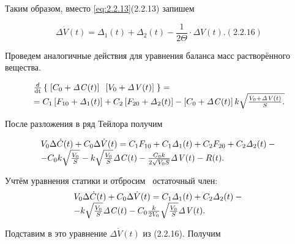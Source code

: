 	Таким образом, вместо \eqref{eq:2.2.13}(2.2.13) запишем

\begin{equation}\label{key}
		 \Delta \dot V(t)=\mathit{\Delta}_{1}(t)+\mathit{\Delta  }_{2}(t)-\frac {1}{2\Theta }\cdot \mathit{\Delta V}(t). (2.2.16)
\end{equation}



		Проведем аналогичные действия для уравнения баланса масс раст­во­рён­ного вещества. 

\begin{equation*}
\begin{matrix}\frac
d{\text{dt}}\left\{\;\left[C_0+\mathit{\Delta C}(t)\right]\;\;\left[V_0+\mathit{\Delta V}(t)\right]\;\right\}=\hfill\null
\\=C_1\left[F_{10}+\mathit{\Delta  }_1(t)\right]+C_2\left[F_{20}+\mathit{\Delta  }_2(t)\right]-\left[C_0+\mathit{\Delta C}(t)\right]k\sqrt{\frac{V_0+\mathit{\Delta V}(t)}
	S.}\hfill\null \end{matrix}\hfill 
\end{equation*}

		После разложения в ряд Тейлора получим

\begin{equation*}
\begin{matrix}V_0\Delta \dot C(t)+C_0\Delta \dot V(t)=C_1F_{10}+C_1\mathit{\Delta  }_1(t)+C_2F_{20}+C_2\mathit{\Delta  }_2(t)-\hfill\null
\\-C_0k\sqrt{\frac{V_0} S}-k\sqrt{\frac{V_0} S}\mathit{\Delta C}(t)-\frac{C_0k}{2\sqrt{V_0S}}\mathit{\Delta V}(t)-R(t).\hfill\null
\end{matrix}\hfill 
\end{equation*}

		Учтём уравнения статики и отбросим \ остаточный член:
\begin{equation*}
\begin{matrix}V_0\Delta \dot C(t)+C_0\Delta \dot V(t)=C_1\mathit{\Delta  }_1(t)+C_2\mathit{\Delta  }_2(t)-\hfill\null \\-k\sqrt{\frac{V_0}
	S}\mathit{\Delta C}(t)-C_0\frac k{2V_0}\sqrt{\frac{V_0} S}\mathit{\Delta V}(t).\hfill\null \end{matrix}\hfill 
\end{equation*}

		Подставим в это уравнение  $\Delta \dot V(t)$ из (2.2.16). Получим\ \ 



\bigskip


